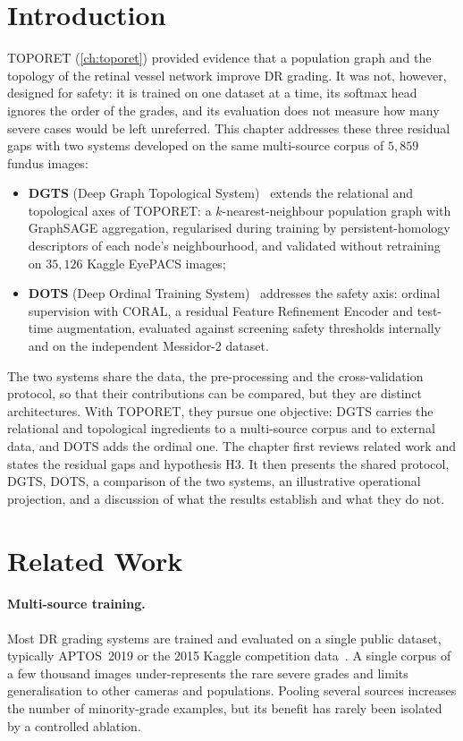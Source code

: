 \section*{Introduction}

TOPORET (\cref{ch:toporet}) provided evidence that a population graph and the topology
of the retinal vessel network improve DR grading. It was not, however, designed for safety: it
is trained on one dataset at a time, its softmax head ignores the order of the grades, and
its evaluation does not measure how many severe cases would be left unreferred. This
chapter addresses these three residual gaps with two systems developed on the same
multi-source corpus of $5{,}859$ fundus images:
\begin{itemize}[leftmargin=1.4em,itemsep=2pt]
\item \textbf{DGTS} (Deep Graph Topological System)~\cite{belhadj2026dgts} extends the
relational and topological axes of TOPORET: a $k$-nearest-neighbour population graph with
GraphSAGE aggregation, regularised during training by persistent-homology descriptors of
each node's neighbourhood, and validated without retraining on $35{,}126$ Kaggle EyePACS
images;
\item \textbf{DOTS} (Deep Ordinal Training System)~\cite{belhadj2026dots} addresses the
safety axis: ordinal supervision with CORAL, a residual Feature Refinement Encoder and
test-time augmentation, evaluated against screening safety thresholds internally and on
the independent Messidor-2 dataset.
\end{itemize}
The two systems share the data, the pre-processing and the cross-validation protocol, so
that their contributions can be compared, but they are distinct architectures. With
TOPORET, they pursue one objective: DGTS carries the relational and topological
ingredients to a multi-source corpus and to external data, and DOTS adds the ordinal one. The
chapter first reviews related work and states the residual gaps and hypothesis H3. It then
presents the shared protocol, DGTS, DOTS, a comparison of the two systems, an illustrative
operational projection, and a discussion of what the results establish and what they do not.

\section{Related Work}
\label{sec:ch4-related}

\paragraph{Multi-source training.}
Most DR grading systems are trained and evaluated on a single public dataset, typically
APTOS~2019 or the 2015 Kaggle competition data~\cite{kaggle2015eyepacs,aptos2019}. A
single corpus of a few thousand images under-represents the rare severe grades and limits
generalisation to other cameras and populations. Pooling several sources increases the
number of minority-grade examples, but its benefit has rarely been isolated by a
controlled ablation.

